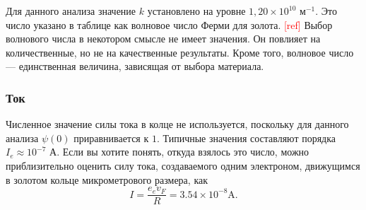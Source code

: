\documentclass[A4,12pt,oneside]{article}
\renewcommand{\(}{\left(}
\renewcommand{\)}{\right)}
\newcommand{\citeph}{\textcolor{red}{[ref] }}
\begin{document}
Для данного анализа значение $k$ установлено на уровне $1,20 \times 10^{10}$ м$^{-1}$. Это число указано в таблице как волновое число Ферми для золота. \citeph
Выбор волнового числа в некотором смысле не имеет значения. Он повлияет на количественные, но не на качественные результаты. Кроме того, волновое число — единственная величина, зависящая от выбора материала.

\subsubsection{Ток}
Численное значение силы тока в колце не используется, поскольку для данного анализа $\psi\left(0\right)$ приравнивается к $1$. Типичные значения составляют порядка $I_e \approx 10^{-7}$ А. Если вы хотите понять, откуда взялось это число, можно приблизительно оценить силу тока, создаваемого одним электроном, движущимся в золотом кольце микрометрового размера, как
\begin{equation}
I = \frac{e_e v_F}{R} = 3.54 \times 10^{-8} \mathrm{A}.
\end{equation}
\end{document}
